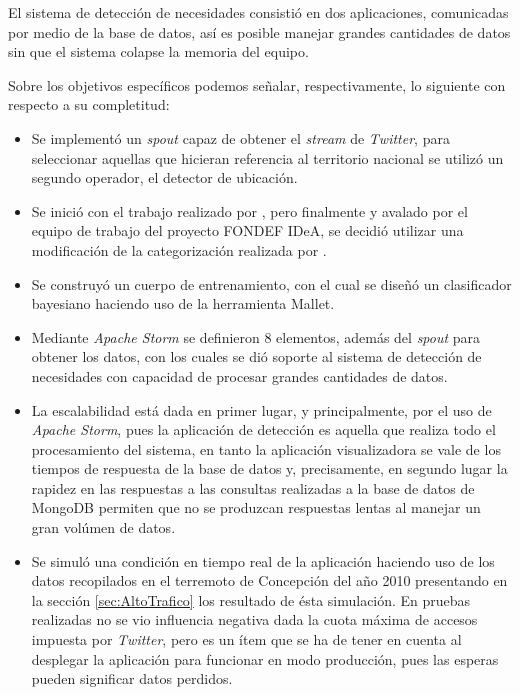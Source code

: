 El sistema de detección de necesidades consistió en dos aplicaciones, comunicadas por medio de la base de datos, así es posible manejar grandes cantidades de datos sin que el sistema colapse la memoria del equipo.

Sobre los objetivos específicos podemos señalar, respectivamente, lo siguiente con respecto a su completitud:

\begin{itemize}
\item Se implementó un \textit{spout} capaz de obtener el \textit{stream} de \textit{Twitter}, para seleccionar aquellas que hicieran referencia al territorio nacional se utilizó un segundo operador, el detector de ubicación.
\item Se inició con el trabajo realizado por \cite{TaxonomiaChato}, pero finalmente y avalado por el equipo de trabajo del proyecto FONDEF IDeA, se decidió utilizar una modificación de la categorización realizada por \cite{PMIProfes}.
\item Se construyó un cuerpo de entrenamiento, con el cual se diseñó un clasificador bayesiano haciendo uso de la herramienta Mallet.
\item Mediante \textit{Apache Storm} se definieron 8 elementos, además del \textit{spout} para obtener los datos, con los cuales se dió soporte al sistema de detección de necesidades con capacidad de procesar grandes cantidades de datos.
\item La escalabilidad está dada en primer lugar, y principalmente, por el uso de \textit{Apache Storm}, pues la aplicación de detección es aquella que realiza todo el procesamiento del sistema, en tanto la aplicación visualizadora se vale de los tiempos de respuesta de la base de datos y, precisamente, en segundo lugar la rapidez en las respuestas a las consultas realizadas a la base de datos de MongoDB permiten que no se produzcan respuestas lentas al manejar un gran volúmen de datos.
\item Se simuló una condición en tiempo real de la aplicación haciendo uso de los datos recopilados en el terremoto de Concepción del año 2010 presentando en la sección \ref{sec:AltoTrafico} los resultado de ésta simulación. En pruebas realizadas no se vio influencia negativa dada la cuota máxima de accesos impuesta por \textit{Twitter}, pero es un ítem que se ha de tener en cuenta al desplegar la aplicación para funcionar en modo producción, pues las esperas pueden significar datos perdidos.
\end{itemize}

